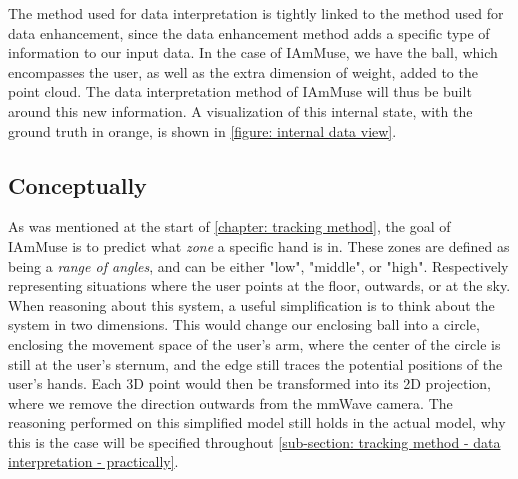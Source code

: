 
The method used for data interpretation is tightly linked to the method used for data enhancement, since the data enhancement method adds a specific type of information to our input data.
In the case of IAmMuse, we have the ball, which encompasses the user, as well as the extra dimension of weight, added to the point cloud.
The data interpretation method of IAmMuse will thus be built around this new information.
A visualization of this internal state, with the ground truth in orange, is shown in \cref{figure: internal data view}.


\subsection{Conceptually}
\label{sub-section: tracking method - data interpretation - conceptually}

As was mentioned at the start of \cref{chapter: tracking method}, the goal of IAmMuse is to predict what \textit{zone} a specific hand is in.
These zones are defined as being a \textit{range of angles}, and can be either "low", "middle", or "high". 
Respectively representing situations where the user points at the floor, outwards, or at the sky.
When reasoning about this system, a useful simplification is to think about the system in two dimensions.
This would change our enclosing ball into a circle, enclosing the movement space of the user's arm, where the center of the circle is still at the user's sternum, and the edge still traces the potential positions of the user's hands. 
Each 3D point would then be transformed into its 2D projection, where we remove the direction outwards from the mmWave camera.
The reasoning performed on this simplified model still holds in the actual model, why this is the case will be specified throughout \cref{sub-section: tracking method - data interpretation - practically}.



